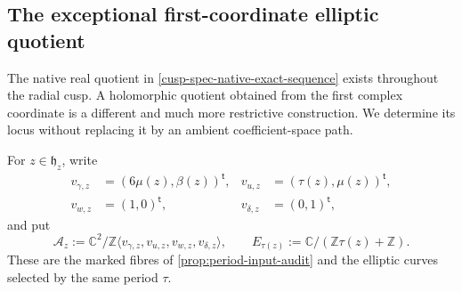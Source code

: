 











\subsection{The exceptional first-coordinate elliptic quotient}

The native real quotient in \cref{cusp-spec-native-exact-sequence} exists
throughout the radial cusp.  A holomorphic quotient obtained from the first
complex coordinate is a different and much more restrictive construction.
We determine its locus without replacing it by an ambient coefficient-space
path.

For \(z\in\mathfrak h_z\), write
\begin{equation}
 \begin{aligned}
  v_{\gamma,z}&=(6\mu(z),\beta(z))^{\mathsf t},&
  v_{u,z}&=(\tau(z),\mu(z))^{\mathsf t},\\
  v_{w,z}&=(1,0)^{\mathsf t},&
  v_{\delta,z}&=(0,1)^{\mathsf t},
 \end{aligned}
 \label{cusp-spec-elliptic-four-periods}
\end{equation}
and put
\begin{equation}
 \mathcal A_z:=\mathbb C^2/
 \mathbb Z\langle v_{\gamma,z},v_{u,z},v_{w,z},v_{\delta,z}\rangle,
 \qquad
 E_{\tau(z)}:=\mathbb C/(\mathbb Z\tau(z)+\mathbb Z).
 \label{cusp-spec-elliptic-source-target}
\end{equation}
These are the marked fibres of \cref{prop:period-input-audit} and the
elliptic curves selected by the same period \(\tau\).

